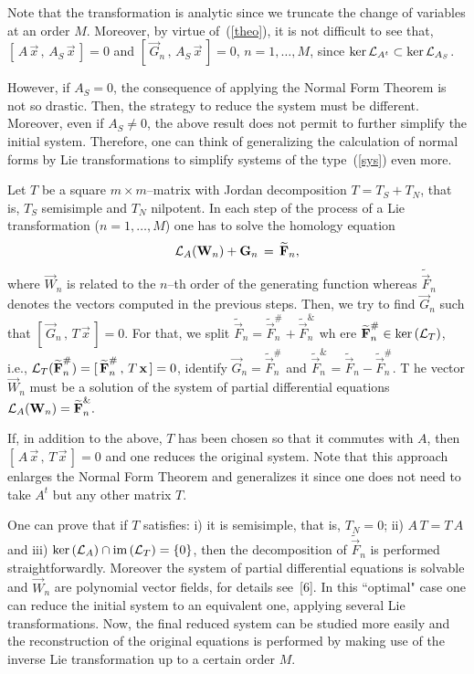 Note that the transformation is analytic since we truncate the change of
variables at an order $M$. Moreover, by virtue
of~(\ref{theo}), it is not difficult to see that,
$[\,A\,\Vec{x}\,,\,A_S\,\Vec{x}\,]=0$ and $[\,\Vec{G}_n\,,\,A_S\,\Vec{x}\,]=0$,
$n=1,\ldots, M$, since $\mbox{ker}\,{\cal L}_{A^t}\subset\mbox{ker}\,{\cal
L}_{A_S}$.

However, if $A_S=0$, the consequence of applying the Normal Form Theorem is
not so drastic.
Then, the strategy to reduce the system must be different. Moreover, even
if $A_S\neq0$, the
above result does not permit to further simplify the initial
system. Therefore, one can think of generalizing the calculation of normal
forms by Lie transformations to simplify  systems of the type~(\ref{sys})
even more.

Let $T$ be a square $m\times m$--matrix with Jordan decomposition $T=T_S+T_N$,
that is, $T_S$ semisimple and $T_N$ nilpotent. In each step of the process of
a Lie transformation ($n=1,\ldots,M$) one has to solve the homology equation
$${\cal L}_A(\Vec{W}_n)+\Vec{G}_n\,=\,\widetilde{\Vec{F}}_n,$$
where $\Vec{W}_n$ is related to the $n$--th order of the generating
function whereas
$\widetilde{\Vec{F}}_n$ denotes the vectors computed in the previous steps.
Then, we try to find $\Vec{G}_n$ such that $[\,\Vec{G}_n\,,\,T\,\Vec{x}\,]=0$.
For that,
we split
$\widetilde{\Vec{F}}_n=\widetilde{\Vec{F}}^{\#}_n+\widetilde{\Vec{F}}^{\&}_n$ wh
ere
$\widetilde{\Vec{F}}^{\#}_n\in
\mbox{ker}\,({\cal L}_T)$, i.e., ${\cal
L}_T(\widetilde{\Vec{F}}^{\#}_n)=[\,\widetilde{\Vec{F}}^{\#}_n\,,\,T\,\Vec{x}\,]
=0$, identify
$\Vec{G}_n=\widetilde{\Vec{F}}^{\#}_n$ and
$\widetilde{\Vec{F}}^{\&}_n=\widetilde{\Vec{F}}_n-\widetilde{\Vec{F}}^{\#}_n$. T
he vector
$\Vec{W}_n$ must be a solution of the system of partial differential equations
${\cal
L}_A(\Vec{W}_n)=\widetilde{\Vec{F}}^{\&}_n.$

If, in addition to the above,  $T$ has been chosen so that it commutes with
$A$, then
$[\,A\,\Vec{x}\,,\,T\,\Vec{x}\,]=0$ and one reduces the original system.
Note that this
approach enlarges the Normal Form Theorem and generalizes it since one does not
need to take $A^t$ but any other matrix $T$.

One can prove that if $T$ satisfies: i) it is semisimple, that is, $T_N=0$;
ii) $A\,T=T\,A$  and
iii) $\mbox{ker}\,({\cal L}_A)\cap\mbox{im}\,({\cal L}_T)=\{0\}$, then the
decomposition of
$\widetilde{\Vec{F}}_n$ is performed straightforwardly. Moreover the
 system of partial differential  equations is solvable and $\Vec{W}_n$ are
polynomial
vector fields, for details see~[6]. In this ``optimal"  case one can reduce the
initial system to an equivalent one, applying several  Lie transformations.
Now, the final reduced
system can be studied more easily and the reconstruction of the original
equations is performed by
making use of the inverse Lie transformation up to a certain order
$M$.

